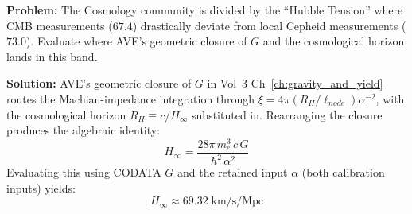 \begin{examplebox}
\textbf{Problem:} The Cosmology community is divided by the ``Hubble Tension'' where CMB measurements ($67.4$) drastically deviate from local Cepheid measurements ($73.0$). Evaluate where AVE's geometric closure of $G$ and the cosmological horizon lands in this band.

\textbf{Solution:} AVE's geometric closure of $G$ in Vol~3 Ch~\ref{ch:gravity_and_yield} routes the Machian-impedance integration through $\xi = 4\pi(R_H/\ell_{node})\alpha^{-2}$, with the cosmological horizon $R_H \equiv c/H_\infty$ substituted in. Rearranging the closure produces the algebraic identity:
\[ H_\infty = \frac{28\pi\,m_e^3\,c\,G}{\hbar^2\,\alpha^2} \]
Evaluating this using CODATA $G$ and the retained input $\alpha$ (both calibration inputs) yields:
\[ H_\infty \approx 69.32\;\text{km/s/Mpc} \]

\end{examplebox}
